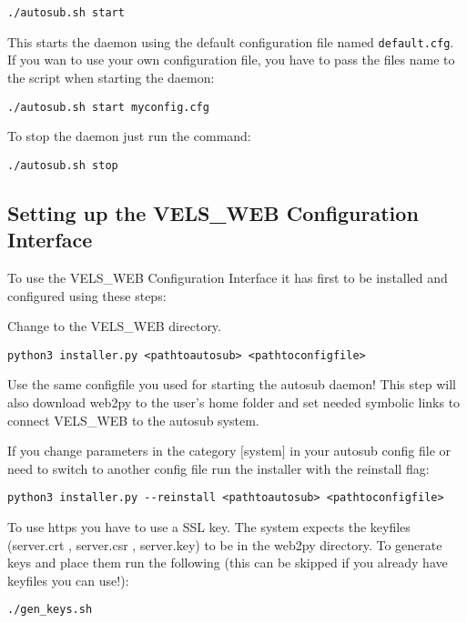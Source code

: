 \begin{verbatim}
./autosub.sh start
\end{verbatim}

This starts the daemon using the default configuration file named {\tt default.cfg}. If you
wan to use your own configuration file, you have to pass the files name to the script when
starting the daemon:

\begin{verbatim}
./autosub.sh start myconfig.cfg
\end{verbatim}

To stop the daemon just run the command:

\begin{verbatim}
./autosub.sh stop
\end{verbatim}

\subsection{Setting up the VELS\_WEB Configuration Interface}
To use the VELS\_WEB Configuration Interface it has first to be installed and
configured using these steps:

Change to the VELS\_WEB directory.

\begin{verbatim}
python3 installer.py <pathtoautosub> <pathtoconfigfile>
\end{verbatim}

Use the same configfile you used for starting the autosub daemon! This step will
also download web2py to the user's home folder and set needed symbolic links to
connect VELS\_WEB to the autosub system.

If you change parameters in the category $[$system$]$ in your autosub config file or need to switch to
another config file run the installer with the reinstall flag:

\begin{verbatim}
python3 installer.py --reinstall <pathtoautosub> <pathtoconfigfile>
\end{verbatim}

To use https you have to use a SSL key. The system expects the keyfiles
(server.crt , server.csr , server.key) to be in the web2py directory. To
generate keys and place them run the following (this can be skipped if you
already have keyfiles you can use!):

\begin{verbatim}
./gen_keys.sh
\end{verbatim}

